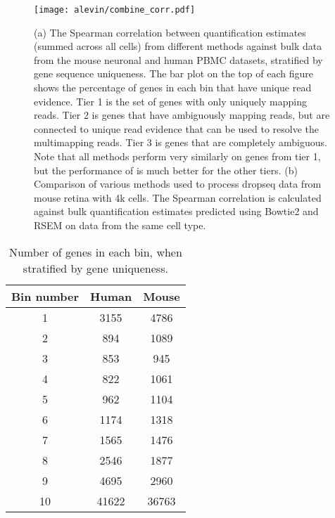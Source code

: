 \begin{figure*}
\centering
    \texttt{[image: alevin/combine\_corr.pdf]}
  \caption{(a) The Spearman correlation between quantification estimates (summed across all cells) from different \scrnaseq methods against bulk data from the mouse neuronal and human PBMC datasets, stratified by gene sequence uniqueness. The bar plot on the top of each figure shows the percentage of genes in each bin that have unique read evidence. Tier 1 is the set of genes with only uniquely mapping reads. Tier 2 is genes that have ambiguously mapping reads, but are connected to unique read evidence that can be used to resolve the multimapping reads. Tier 3 is  genes that are completely ambiguous. Note that all methods perform very similarly on genes from tier 1, but the performance of \alevin is much better for the other tiers. (b) Comparison of various methods used to process dropseq data from mouse retina with 4k cells. The Spearman correlation is calculated against bulk quantification estimates predicted using Bowtie2 and RSEM on data from the same cell type.}
  \label{fig:correlation}
\end{figure*}

\begin{table}[!htb]
\centering
\caption{Number of genes in each bin, when stratified by gene uniqueness.}
      \begin{tabular}{ccc}
        \hline
           Bin number & Human  & Mouse \\ \hline
    1 & 3155 & 4786 \\
    2 & 894 & 1089 \\
    3 & 853 & 945 \\
    4 & 822 & 1061 \\
    5 & 962 & 1104 \\
    6 & 1174 & 1318 \\
    7 & 1565 & 1476 \\     
    8 & 2546 & 1877 \\ 
    9 & 4695 & 2960 \\ 
    10 & 41622 & 36763 \\ \hline
      \end{tabular}
      \label{suptab:bin_sizes}
\end{table}

